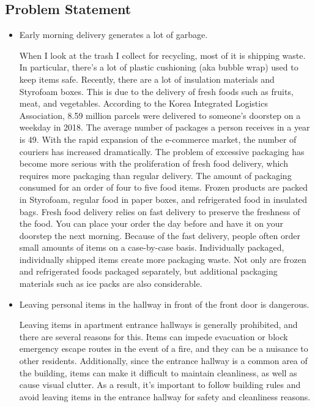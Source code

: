 \documentclass[conference]{IEEEtran}
\begin{document}
\subsection{Problem Statement}
\begin{itemize}
    \item Early morning delivery generates a lot of garbage.\par
    When I look at the trash I collect for recycling, most of it is shipping waste. In particular, there's a lot of plastic cushioning (aka bubble wrap) used to keep items safe. Recently, there are a lot of insulation materials and Styrofoam boxes. This is due to the delivery of fresh foods such as fruits, meat, and vegetables.
    According to the Korea Integrated Logistics Association, 8.59 million parcels were delivered to someone's doorstep on a weekday in 2018. The average number of packages a person receives in a year is 49. With the rapid expansion of the e-commerce market, the number of couriers has increased dramatically. The problem of excessive packaging has become more serious with the proliferation of fresh food delivery, which requires more packaging than regular delivery.
    The amount of packaging consumed for an order of four to five food items. Frozen products are packed in Styrofoam, regular food in paper boxes, and refrigerated food in insulated bags. 
    Fresh food delivery relies on fast delivery to preserve the freshness of the food. You can place your order the day before and have it on your doorstep the next morning. Because of the fast delivery, people often order small amounts of items on a case-by-case basis. Individually packaged, individually shipped items create more packaging waste. Not only are frozen and refrigerated foods packaged separately, but additional packaging materials such as ice packs are also considerable. 
    
    \item Leaving personal items in the hallway in front of the front door is dangerous. \par
    Leaving items in apartment entrance hallways is generally prohibited, and there are several reasons for this. Items can impede evacuation or block emergency escape routes in the event of a fire, and they can be a nuisance to other residents. Additionally, since the entrance hallway is a common area of the building, items can make it difficult to maintain cleanliness, as well as cause visual clutter. As a result, it's important to follow building rules and avoid leaving items in the entrance hallway for safety and cleanliness reasons.
    

\end{itemize}
\end{document}
